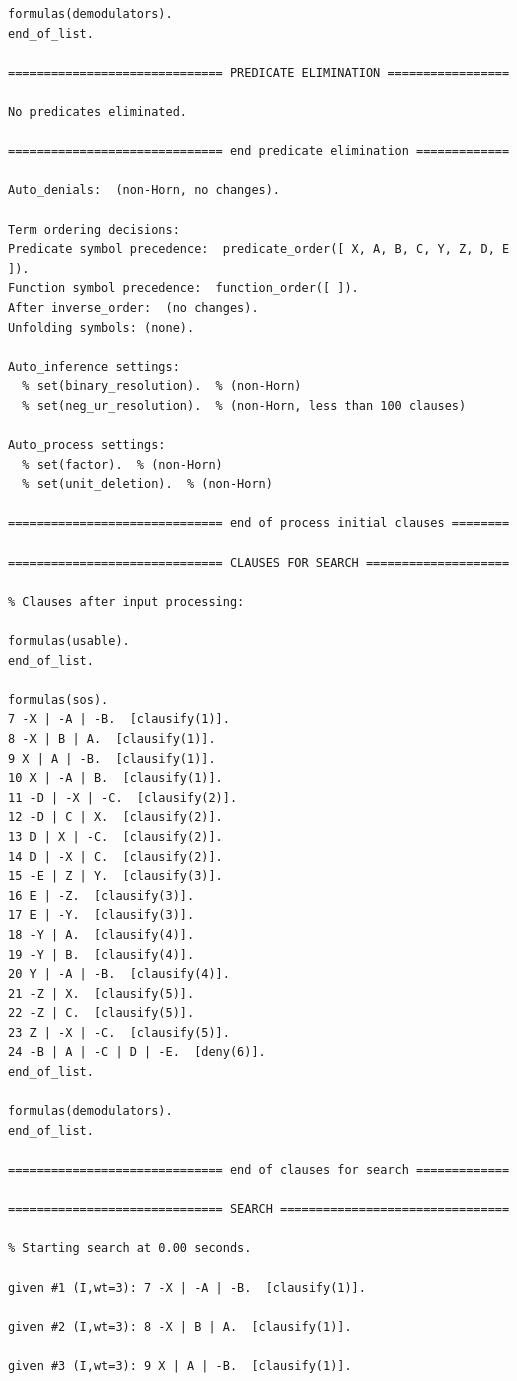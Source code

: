 \documentclass[fullpage]{article}
\begin{document}
{\begin{verbatim}
formulas(demodulators).
end_of_list.

============================== PREDICATE ELIMINATION =================

No predicates eliminated.

============================== end predicate elimination =============

Auto_denials:  (non-Horn, no changes).

Term ordering decisions:
Predicate symbol precedence:  predicate_order([ X, A, B, C, Y, Z, D, E ]).
Function symbol precedence:  function_order([ ]).
After inverse_order:  (no changes).
Unfolding symbols: (none).

Auto_inference settings:
  % set(binary_resolution).  % (non-Horn)
  % set(neg_ur_resolution).  % (non-Horn, less than 100 clauses)

Auto_process settings:
  % set(factor).  % (non-Horn)
  % set(unit_deletion).  % (non-Horn)

============================== end of process initial clauses ========

============================== CLAUSES FOR SEARCH ====================

% Clauses after input processing:

formulas(usable).
end_of_list.

formulas(sos).
7 -X | -A | -B.  [clausify(1)].
8 -X | B | A.  [clausify(1)].
9 X | A | -B.  [clausify(1)].
10 X | -A | B.  [clausify(1)].
11 -D | -X | -C.  [clausify(2)].
12 -D | C | X.  [clausify(2)].
13 D | X | -C.  [clausify(2)].
14 D | -X | C.  [clausify(2)].
15 -E | Z | Y.  [clausify(3)].
16 E | -Z.  [clausify(3)].
17 E | -Y.  [clausify(3)].
18 -Y | A.  [clausify(4)].
19 -Y | B.  [clausify(4)].
20 Y | -A | -B.  [clausify(4)].
21 -Z | X.  [clausify(5)].
22 -Z | C.  [clausify(5)].
23 Z | -X | -C.  [clausify(5)].
24 -B | A | -C | D | -E.  [deny(6)].
end_of_list.

formulas(demodulators).
end_of_list.

============================== end of clauses for search =============

============================== SEARCH ================================

% Starting search at 0.00 seconds.

given #1 (I,wt=3): 7 -X | -A | -B.  [clausify(1)].

given #2 (I,wt=3): 8 -X | B | A.  [clausify(1)].

given #3 (I,wt=3): 9 X | A | -B.  [clausify(1)].


\end{verbatim}}
\end{document}
